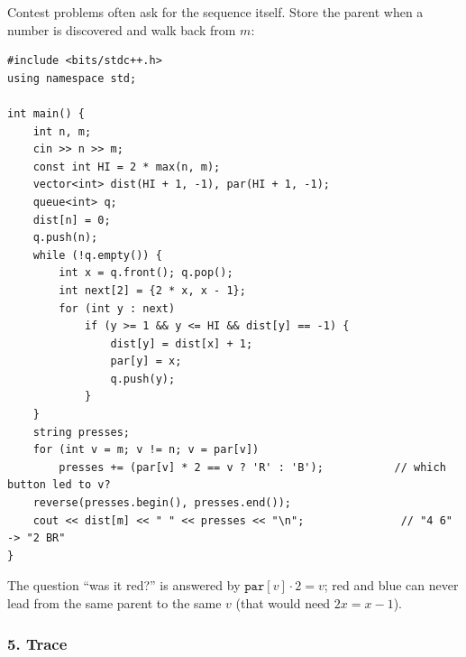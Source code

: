 \begin{tricksbox}
Contest problems often ask for the sequence itself. Store the parent when a number is discovered and walk back from $m$:
\begin{lstlisting}[style=cpp]
#include <bits/stdc++.h>
using namespace std;

int main() {
    int n, m;
    cin >> n >> m;
    const int HI = 2 * max(n, m);
    vector<int> dist(HI + 1, -1), par(HI + 1, -1);
    queue<int> q;
    dist[n] = 0;
    q.push(n);
    while (!q.empty()) {
        int x = q.front(); q.pop();
        int next[2] = {2 * x, x - 1};
        for (int y : next)
            if (y >= 1 && y <= HI && dist[y] == -1) {
                dist[y] = dist[x] + 1;
                par[y] = x;
                q.push(y);
            }
    }
    string presses;
    for (int v = m; v != n; v = par[v])
        presses += (par[v] * 2 == v ? 'R' : 'B');           // which button led to v?
    reverse(presses.begin(), presses.end());
    cout << dist[m] << " " << presses << "\n";               // "4 6" -> "2 BR"
}
\end{lstlisting}
The question ``was it red?'' is answered by $\texttt{par}[v] \cdot 2 = v$; red and blue can never lead from the same parent to the same $v$ (that would need $2x = x - 1$).
\end{tricksbox}

\subsubsection*{5. Trace}

